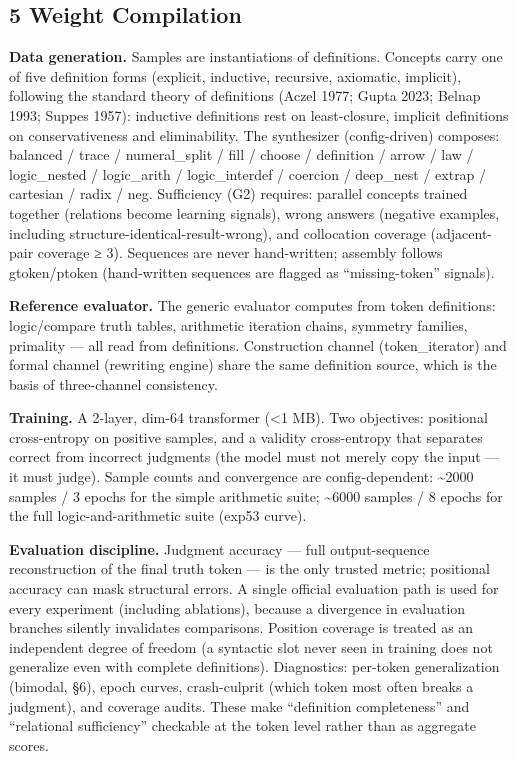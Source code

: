 \documentclass[
]{article}
\begin{document}
\subsection{5 Weight Compilation}\label{weight-compilation}

\textbf{Data generation.} Samples are instantiations of definitions.
Concepts carry one of five definition forms (explicit, inductive,
recursive, axiomatic, implicit), following the standard theory of
definitions (Aczel 1977; Gupta 2023; Belnap 1993; Suppes 1957):
inductive definitions rest on least-closure, implicit definitions on
conservativeness and eliminability. The synthesizer (config-driven)
composes: balanced / trace / numeral\_split / fill / choose / definition
/ arrow / law / logic\_nested / logic\_arith / logic\_interdef /
coercion / deep\_nest / extrap / cartesian / radix / neg. Sufficiency
(G2) requires: parallel concepts trained together (relations become
learning signals), wrong answers (negative examples, including
structure-identical-result-wrong), and collocation coverage
(adjacent-pair coverage ≥ 3). Sequences are never hand-written; assembly
follows gtoken/ptoken (hand-written sequences are flagged as
``missing-token'' signals).

\textbf{Reference evaluator.} The generic evaluator computes from token
definitions: logic/compare truth tables, arithmetic iteration chains,
symmetry families, primality --- all read from definitions. Construction
channel (token\_iterator) and formal channel (rewriting engine) share
the same definition source, which is the basis of three-channel
consistency.

\textbf{Training.} A 2-layer, dim-64 transformer (\textless1 MB). Two
objectives: positional cross-entropy on positive samples, and a validity
cross-entropy that separates correct from incorrect judgments (the model
must not merely copy the input --- it must judge). Sample counts and
convergence are config-dependent: \textasciitilde2000 samples / 3 epochs
for the simple arithmetic suite; \textasciitilde6000 samples / 8 epochs
for the full logic-and-arithmetic suite (exp53 curve).

\textbf{Evaluation discipline.} Judgment accuracy --- full
output-sequence reconstruction of the final truth token --- is the only
trusted metric; positional accuracy can mask structural errors. A single
official evaluation path is used for every experiment (including
ablations), because a divergence in evaluation branches silently
invalidates comparisons. Position coverage is treated as an independent
degree of freedom (a syntactic slot never seen in training does not
generalize even with complete definitions). Diagnostics: per-token
generalization (bimodal, §6), epoch curves, crash-culprit (which token
most often breaks a judgment), and coverage audits. These make
``definition completeness'' and ``relational sufficiency'' checkable at
the token level rather than as aggregate scores.
\end{document}
